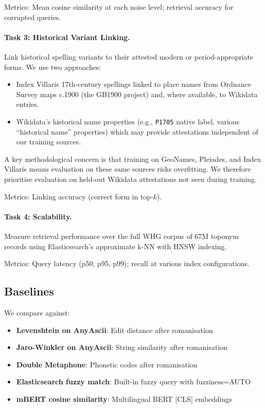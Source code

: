 \documentclass[11pt,a4paper]{article}
\begin{document}
Metrics: Mean cosine similarity at each noise level; retrieval accuracy for corrupted queries.

\paragraph{Task 3: Historical Variant Linking.} Link historical spelling variants to their attested modern or period-appropriate forms. We use two approaches:
\begin{itemize}
    \item Index Villaris 17th-century spellings linked to place names from Ordnance Survey maps c.1900 (the GB1900 project) and, where available, to Wikidata entries.
    \item Wikidata's historical name properties (e.g., \texttt{P1705} native label, various ``historical name'' properties) which may provide attestations independent of our training sources.
\end{itemize}
A key methodological concern is that training on GeoNames, Pleiades, and Index Villaris means evaluation on these same sources risks overfitting. We therefore prioritise evaluation on held-out Wikidata attestations not seen during training.

Metrics: Linking accuracy (correct form in top-$k$).

\paragraph{Task 4: Scalability.} Measure retrieval performance over the full WHG corpus of 67M toponym records using Elasticsearch's approximate k-NN with HNSW indexing.

Metrics: Query latency (p50, p95, p99); recall at various index configurations.

\subsection{Baselines}

We compare against:

\begin{itemize}
    \item \textbf{Levenshtein on AnyAscii}: Edit distance after romanisation
    \item \textbf{Jaro-Winkler on AnyAscii}: String similarity after romanisation
    \item \textbf{Double Metaphone}: Phonetic codes after romanisation
    \item \textbf{Elasticsearch fuzzy match}: Built-in fuzzy query with fuzziness=AUTO
    \item \textbf{mBERT cosine similarity}: Multilingual BERT [CLS] embeddings
\end{itemize}
\end{document}
